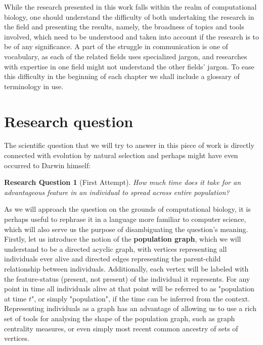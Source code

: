 \documentclass{l4proj}
\newtheorem*{quest}{Research Question}
\newif\ifdebug
\begin{document}
While the research presented in this work falls within the realm of computational biology, one should understand the difficulty of both undertaking the research in the field and presenting the results, namely, the broadness of topics and tools involved, which need to be understood and taken into account if the research is to be of any significance. A part of the struggle in communication is one of vocabulary, as each of the related fields uses specialized jargon, and researches with expertise in one field might not understand the other fields' jargon. To ease this difficulty in the beginning of each chapter we shall include a glossary of terminology in use.

\section{Research question}
The scientific question that we will try to answer in this piece of work is directly connected with evolution by natural selection and perhaps might have even occurred to Darwin himself:

\begin{quest}[First Attempt]
How much time does it take for an advantageous feature in an individual to spread across entire population?
\end{quest}

\ifdebug
  Next paragraph doesn't have to be included in the final version of the dissertation.
\fi

As we will approach the question on the grounds of computational biology, it is perhaps useful to rephrase it in a language more familiar to computer science, which will also serve us the purpose of disambiguating the question's meaning. Firstly, let us introduce the notion of the \textbf{population graph}, which we will understand to be a directed acyclic graph, with vertices representing all individuals ever alive and directed edges representing the parent-child relationship between individuals. Additionally, each vertex will be labeled with the feature-status (present, not present) of the individual it represents. For any point in time all individuals alive at that point will be referred to as "population at time $t$", or simply "population", if the time can be inferred from the context. Representing individuals as a graph has an advantage of allowing us to use a rich set of tools for analysing the shape of the population graph, such as graph centrality measures, or even simply most recent common ancestry of sets of vertices.
\end{document}
